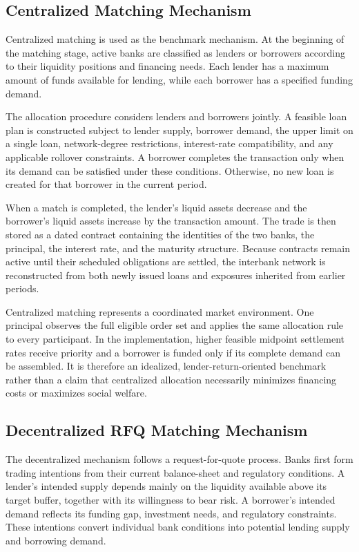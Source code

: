\subsection{Centralized Matching Mechanism}

Centralized matching is used as the benchmark mechanism. At the
beginning of the matching stage, active banks are classified as lenders
or borrowers according to their liquidity positions and financing needs.
Each lender has a maximum amount of funds available for lending, while
each borrower has a specified funding demand.

The allocation procedure considers lenders and borrowers jointly. A
feasible loan plan is constructed subject to lender supply, borrower
demand, the upper limit on a single loan, network-degree restrictions,
interest-rate compatibility, and any applicable rollover constraints. A
borrower completes the transaction only when its demand can be satisfied
under these conditions. Otherwise, no new loan is created for that
borrower in the current period.

When a match is completed, the lender's liquid assets decrease and the
borrower's liquid assets increase by the transaction amount. The trade
is then stored as a dated contract containing the identities of the two
banks, the principal, the interest rate, and the maturity structure.
Because contracts remain active until their scheduled obligations are
settled, the interbank network is reconstructed from both newly issued
loans and exposures inherited from earlier periods.

Centralized matching represents a coordinated market environment. One
principal observes the full eligible order set and applies the same
allocation rule to every participant. In the implementation, higher
feasible midpoint settlement rates receive priority and a borrower is
funded only if its complete demand can be assembled. It is therefore an
idealized, lender-return-oriented benchmark rather than a claim that
centralized allocation necessarily minimizes financing costs or maximizes
social welfare.

\subsection{Decentralized RFQ Matching Mechanism}

The decentralized mechanism follows a request-for-quote process. Banks
first form trading intentions from their current balance-sheet and
regulatory conditions. A lender's intended supply depends mainly on the
liquidity available above its target buffer, together with its
willingness to bear risk. A borrower's intended demand reflects its
funding gap, investment needs, and regulatory constraints. These
intentions convert individual bank conditions into potential lending
supply and borrowing demand.

